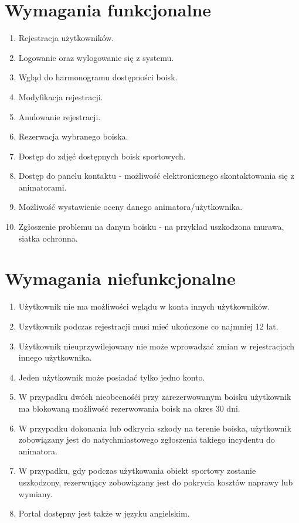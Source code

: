 \documentclass[a4paper,11pt]{article}
\begin{document}
\section {Wymagania funkcjonalne}
\begin{enumerate}
	\item Rejestracja użytkowników.
	\item Logowanie oraz wylogowanie się z systemu.
	\item Wgląd do harmonogramu dostępności boisk.
	\item Modyfikacja rejestracji.
	\item Anulowanie rejestracji.
	\item Rezerwacja wybranego boiska.
	\item Dostęp do zdjęć dostępnych boisk sportowych.
	\item Dostęp do panelu kontaktu - możliwość elektronicznego skontaktowania się z animatorami.
	\item Możliwość wystawienie oceny danego animatora/użytkownika. 
	\item Zgłoszenie problemu na danym boisku - na przykład uszkodzona murawa, siatka ochronna.
\end{enumerate}

\section {Wymagania niefunkcjonalne}
\begin{enumerate}
	\item Użytkownik nie ma możliwości wglądu w konta innych użytkowników.
	\item Uzytkownik podczas rejestracji musi mieć ukończone co najmniej 12 lat.
	\item Użytkownik nieuprzywilejowany nie może wprowadzać zmian w rejestracjach innego użytkownika.
	\item Jeden użytkownik może posiadać tylko jedno konto.
	\item W przypadku dwóch nieobecnośći przy zarezerwowanym boisku użytkownik ma blokowaną możliwość rezerwowania boisk na okres 30 dni.
	\item W przypadku dokonania lub odkrycia szkody na terenie boiska, użytkownik zobowiązany jest do natychmiastowego zgłoszenia takiego incydentu do animatora. 
	\item W przypadku, gdy podczas użytkowania obiekt sportowy zostanie uszkodzony, rezerwujący zobowiązany jest do pokrycia kosztów naprawy lub wymiany. 
	\item Portal dostępny jest także w języku angielskim.
\end{enumerate}
\end{document}
